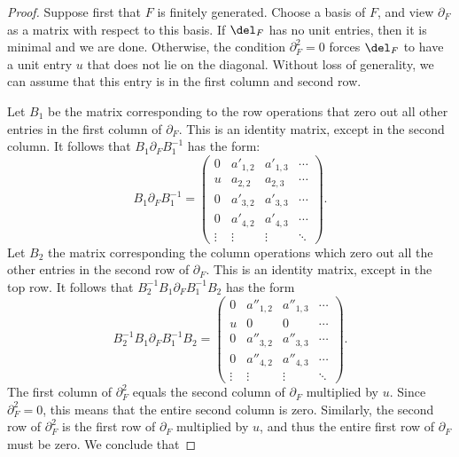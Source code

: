 \documentclass[12pt]{amsart}
\theoremstyle{definition}
\theoremstyle{remark}
\newcommand{\michael}[1]{{\color{red} \sf $\clubsuit\clubsuit\clubsuit$ Michael: [#1]}}
\begin{document}
\begin{proof}
Suppose first that $F$ is finitely generated. Choose a basis of $F$, and view $\partial_F$ as a matrix with respect to this basis. If $\del_F$ has no unit entries, then it is minimal and we are done.  Otherwise, the condition $\partial_F^2 =0$ forces $\del_F$ to have a unit entry $u$ that does not lie on the diagonal. Without loss of generality, we can assume that this entry is in the first column and second row.  
\iffalse
After acting by the diagonal matrix with entries $(1,u^{-1},1,1,\dots)$ we can assume that $u=1$. \michael{I think this isn't allowed. We can't turn $u$ into 1 by conjugating. So our definition of a trivial DM should involve any unit, not just 1.} So we have:
\[
\partial_F = \begin{pmatrix}
a_{1,1}&a_{1,2}&a_{1,3}&\cdots \\
1&a_{2,2}&a_{2,3}&\cdots \\
a_{3,1}&a_{3,2}&a_{3,3}&\cdots\\
a_{4,1}&a_{4,2}&a_{4,3}&\cdots\\
\vdots&\vdots&\vdots&\ddots
\end{pmatrix}
\]
\fi
Let $B_1$ be the matrix corresponding to the row operations that zero out all other entries in the first column of $\partial_F$.  This is an identity matrix, except in the second column.  It follows that $B_1\partial_FB_1^{-1}$ has the form:
\[
B_1\partial_F B_1^{-1}
=
\begin{pmatrix}
0&a'_{1,2}&a'_{1,3}&\cdots \\
u&a_{2,2}&a_{2,3}&\cdots \\
0&a'_{3,2}&a'_{3,3}&\cdots\\
0&a'_{4,2}&a'_{4,3}&\cdots\\
\vdots&\vdots&\vdots&\ddots
\end{pmatrix}.
\]
Let $B_2$ the matrix corresponding the column operations which zero out all the other entries in the second row of $\partial_F$.  This is an identity matrix, except in the top row.  It follows that $B_2^{-1}B_1\partial_F B_1^{-1}B_2$ has the form
\[
B_2^{-1}B_1\partial_F B_1^{-1}B_2
=
\begin{pmatrix}
0&a''_{1,2}&a''_{1,3}&\cdots \\
u&0&0&\cdots \\
0&a''_{3,2}&a''_{3,3}&\cdots\\
0&a''_{4,2}&a''_{4,3}&\cdots\\
\vdots&\vdots&\vdots&\ddots
\end{pmatrix}.
\]
The first column of $\partial_F^2$ equals the second column of $\partial_F$ multiplied by $u$. Since $\partial_F^2=0$, this means that the entire second column is zero.  Similarly, the second row of $\partial_F^2$ is the first row of $\partial_F$ multiplied by $u$, and thus the entire first row of $\partial_F$ must be zero. We conclude that

\end{proof}
\end{document}
